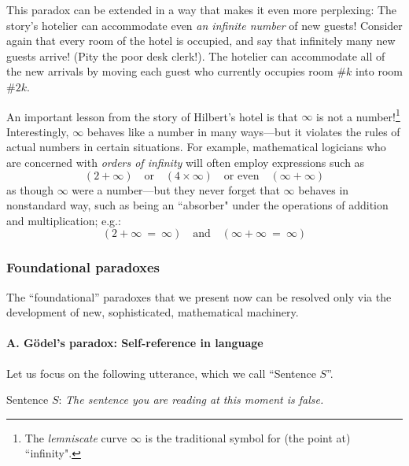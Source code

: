 \medskip
  
This paradox can be extended in a way that makes it even more 
perplexing:  The story's hotelier can accommodate even 
{\em an infinite number} of new guests!  Consider again that every room 
of the hotel is occupied, and say that infinitely many new guests 
arrive!  (Pity the poor desk clerk!). The hotelier can accommodate all of
the new arrivals by moving each guest who currently occupies room \#$k$
into room \#$2k$. 

\medskip

An important lesson from the story of Hilbert's hotel is that $\infty$ is not a 
number!\footnote{The \textit{lemniscate} curve $\infty$ is the traditional
symbol for (the point at) ``infinity".} Interestingly, $\infty$ behaves like a 
number in many ways---but it violates the rules of actual numbers in certain
situations.  For example, mathematical logicians who are concerned with
{\em orders of infinity} will often employ expressions such as
\[ (2 + \infty)  \ \ \  \mbox{ or } \ \ \ (4 \times \infty) \ \ \
\mbox{ or even } \ \ \ (\infty + \infty) \]
as though $\infty$ were a number---but they never forget that $\infty$
behaves in nonstandard way, such as being an ``absorber" under the operations
of addition and multiplication; e.g.:
\[ (2 + \infty \ = \ \infty)  \ \ \  \mbox{ and } \ \ \  (\infty + \infty \ = \ \infty) \]



\subsubsection{Foundational paradoxes}
\label{sec:paradoxes}

The ``foundational'' paradoxes that we present now can be resolved
only via the development of new, sophisticated, mathematical
machinery.

\paragraph{A.  G\"{o}del's paradox: Self-reference in language}

Let us focus on the following utterance, which we call ``Sentence $S$''.

Sentence $S$: {\em The sentence you are reading at this moment is false.}

